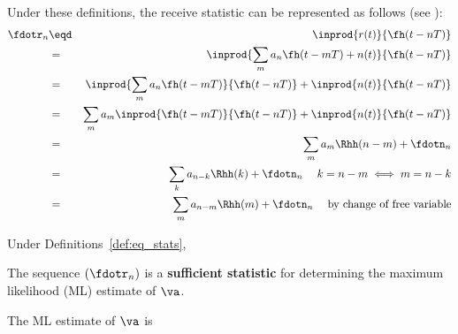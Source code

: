 \begin{definition}
\label{def:eq_stats}
\end{definition}

Under these definitions, the receive statistic can be represented as follows
(see ):
\begin{eqnarray*}
   \fdotr_n
     &\eqd& \inprod{r(t)}{\fh(t-nT)} 
   \\&=&    \inprod{\sum_m a_n \fh(t-mT) + n(t)}{\fh(t-nT)} 
   \\&=&    \inprod{\sum_m a_n \fh(t-mT)}{\fh(t-nT)} + \inprod{n(t)}{\fh(t-nT)} 
   \\&=&    \sum_m a_m \inprod{\fh(t-mT)}{\fh(t-nT)} + \inprod{n(t)}{\fh(t-nT)} 
   \\&=&    \sum_m a_m \Rhh(n-m) + \fdotn_n
   \\&=&    \sum_k a_{n-k} \Rhh(k) + \fdotn_n
            \hspace{3ex}k=n-m \iff m=n-k
   \\&=&    \sum_m a_{n-m} \Rhh(m) + \fdotn_n
            \hspace{3ex}\mbox{by change of free variable}
\end{eqnarray*}
\begin{theorem}
\label{thm:eq-ml}
Under Definitions~\ref{def:eq_stats},
\begin{enume}
   \item The sequence $(\fdotr_n)$ is a {\bf sufficient statistic} 
         for determining the maximum likelihood (ML) estimate of $\va$.
   \item The ML estimate of $\va$ is
\end{enume}
\end{theorem}



